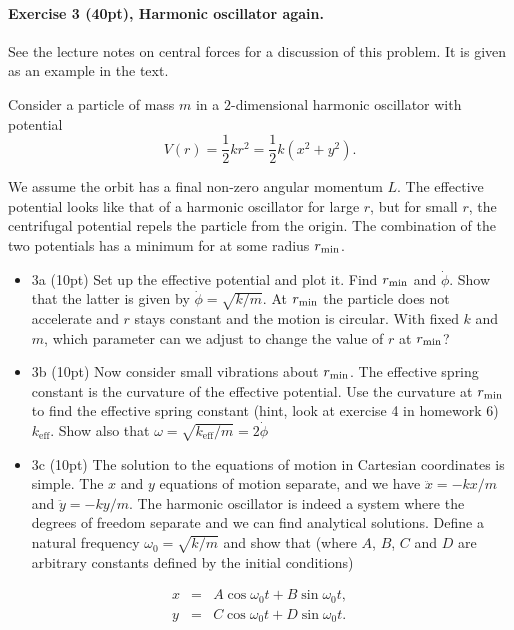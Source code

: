 \documentclass[%
oneside,                 %
final,                   %
10pt]{article}
\begin{document}
\noindent
\paragraph{Exercise 3 (40pt), Harmonic oscillator again.}
See the lecture notes on central forces for a discussion of this problem. It is given as an example in the text.

Consider a particle of mass $m$ in a $2$-dimensional harmonic oscillator with potential
\[
V(r)=\frac{1}{2}kr^2=\frac{1}{2}k(x^2+y^2).
\]

We assume the orbit has a final non-zero angular momentum $L$.  The
effective potential looks like that of a harmonic oscillator for large
$r$, but for small $r$, the centrifugal potential repels the particle
from the origin. The combination of the two potentials has a minimum
for at some radius $r_{\rm min}$.


\begin{itemize}
\item 3a (10pt) Set up the effective potential and plot it. Find $r_{\rm min}$ and $\dot{\phi}$. Show that the latter is given by $\dot{\phi}=\sqrt{k/m}$.  At $r_{\rm min}$ the particle does not accelerate and $r$ stays constant and the motion is circular. With fixed $k$ and $m$, which parameter can we adjust to change the value of $r$ at $r_{\rm min}$?

\item 3b (10pt) Now consider small vibrations about $r_{\rm min}$. The effective spring constant is the curvature of the effective potential.  Use the curvature at $r_{\rm min}$ to find the effective spring constant (hint, look at  exercise 4 in homework 6) $k_{\mathrm{eff}}$. Show also that $\omega=\sqrt{k_{\mathrm{eff}}/m}=2\dot{\phi}$  

\item 3c (10pt) The solution to the equations of motion in Cartesian coordinates is simple. The $x$ and $y$ equations of motion separate, and we have $\ddot{x}=-kx/m$ and $\ddot{y}=-ky/m$. The harmonic oscillator is indeed a system where the degrees of freedom separate and we can find analytical solutions. Define a natural frequency $\omega_0=\sqrt{k/m}$ and show that (where $A$, $B$, $C$ and $D$ are arbitrary constants defined by the initial conditions)
\end{itemize}

\noindent
\begin{eqnarray*}
x&=&A\cos\omega_0 t+B\sin\omega_0 t,\\
y&=&C\cos\omega_0 t+D\sin\omega_0 t.
\end{eqnarray*}
\end{document}
